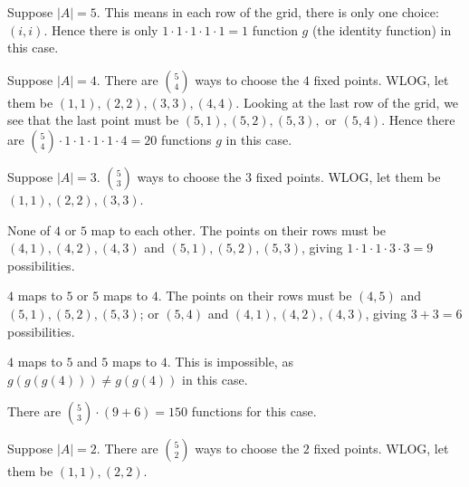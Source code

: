 \documentclass{article}
\begin{document}
    \begin{Cases}
        \item Suppose $|A| = 5$. This means in each row of the grid, there is only one choice: $(i, i)$. Hence there is only $1 \cdot 1 \cdot 1 \cdot 1 \cdot 1 = 1$ function $g$ (the identity function) in this case.
        \item Suppose $|A| = 4$. There are $\binom{5}{4}$ ways to choose the $4$ fixed points. WLOG, let them be $(1, 1), (2, 2), (3, 3), (4, 4)$. Looking at the last row of the grid, we see that the last point must be $(5, 1), (5, 2), (5, 3),$ or $(5, 4)$. Hence there are $\binom{5}{4} \cdot 1 \cdot 1 \cdot 1 \cdot 1 \cdot 4 = 20$ functions $g$ in this case.
        \item Suppose $|A| = 3$. $\binom 53$ ways to choose the $3$ fixed points. WLOG, let them be $(1, 1), (2, 2), (3, 3)$.
        
        \begin{Cases}[label* = \arabic*., itemindent = .6in, topsep = 0.04in]
            \item None of $4$ or $5$ map to each other. The points on their rows must be $(4, 1), (4, 2), (4, 3)$ and $(5, 1), (5, 2), (5, 3)$, giving $1 \cdot 1 \cdot 1 \cdot 3 \cdot 3 = 9$ possibilities.
            \item $4$ maps to $5$ or $5$ maps to $4$. The points on their rows must be $(4, 5)$ and $(5, 1), (5, 2), (5, 3)$; or $(5, 4)$ and $(4, 1), (4, 2), (4, 3)$, giving $3+3 = 6$ possibilities.
            \item $4$ maps to $5$ and $5$ maps to $4$. This is impossible, as $g(g(g(4))) \ne g(g(4))$ in this case.
        \end{Cases}
        There are $\binom 53 \cdot (9+6) = 150$ functions for this case.
        \item Suppose $|A| = 2$. There are $\binom{5}{2}$ ways to choose the $2$ fixed points. WLOG, let them be $(1, 1), (2, 2)$.
        

\end{Cases}
\end{document}
